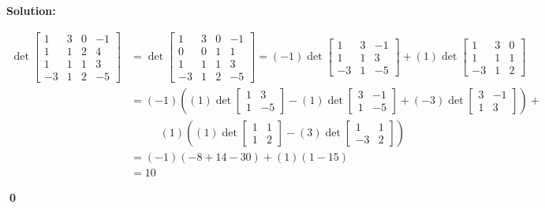 \documentclass{article}
\newenvironment{solution}
{
  \ignorespaces
  \textbf{Solution:}
}
{
  \ignorespacesafterend
  \begin{flushright}
  {\bfseries \qed}
  \end{flushright}
}
\begin{document}
\begin{solution}
 \begin{align*}
\det
   \begin{bmatrix}
     1 & 3 & 0 & -1 \\
     1 & 1 & 2 & 4 \\
     1 & 1 & 1 & 3 \\
     -3 & 1 & 2 & -5
   \end{bmatrix}
 &= \det \begin{bmatrix} 1 & 3 & 0 & -1 \\ 0 & 0 & 1 & 1 \\ 1 & 1 & 1 & 3 \\ -3 & 1 & 2 & -5 \end{bmatrix} =
 (-1) \det \begin{bmatrix} 1 & 3 & -1 \\ 1 & 1 & 3 \\ -3 & 1 & -5 \end{bmatrix} + (1) \det \begin{bmatrix} 1 & 3 & 0 \\ 1 & 1 & 1 \\ -3 & 1 & 2 \end{bmatrix} \\
 &= (-1) \left( (1) \det \begin{bmatrix} 1 & 3 \\ 1 & -5 \end{bmatrix} - (1) \det \begin{bmatrix} 3 & -1 \\ 1 & -5 \end{bmatrix} + (-3) \det \begin{bmatrix} 3 & -1 \\ 1 & 3 \end{bmatrix} \right) + \\
 &\phantom{==} (1) \left( (1) \det \begin{bmatrix} 1 & 1 \\ 1 & 2 \end{bmatrix} - (3) \det \begin{bmatrix} 1 & 1 \\ -3 & 2 \end{bmatrix} \right) \\
 &= (-1) \left( -8+14-30 \right) + (1) \left(1-15 \right) \\
 &=10
 \end{align*}

\end{solution}
\end{document}
